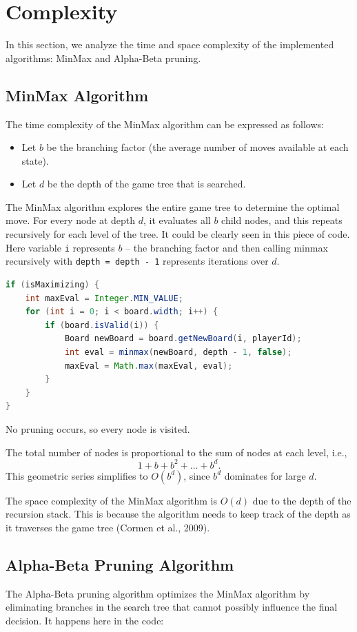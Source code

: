 \documentclass[11pt,a4paper]{article}
\begin{document}
\section{Complexity}
In this section, we analyze the time and space complexity of the implemented algorithms: MinMax and Alpha-Beta pruning.

\subsection{MinMax Algorithm}
The time complexity of the MinMax algorithm can be expressed as follows:
\begin{itemize}
    \item Let $b$ be the branching factor (the average number of moves available at each state).
    \item Let $d$ be the depth of the game tree that is searched.
\end{itemize}

The MinMax algorithm explores the entire game tree to determine the optimal move. For every node at depth $d$, it evaluates all $b$ child nodes, and this repeats recursively for each level of the tree. It could be clearly seen in this piece of code. Here variable \texttt{i} represents $b$ -- the branching factor and then calling minmax recursively with \texttt{depth = depth - 1} represents iterations over $d$.

\begin{lstlisting}[language=Java,basicstyle=\ttfamily\small,frame=single]
if (isMaximizing) {
    int maxEval = Integer.MIN_VALUE;
    for (int i = 0; i < board.width; i++) {
        if (board.isValid(i)) {
            Board newBoard = board.getNewBoard(i, playerId);
            int eval = minmax(newBoard, depth - 1, false);
            maxEval = Math.max(maxEval, eval);
        }
    }
}
\end{lstlisting}

No pruning occurs, so every node is visited.

The total number of nodes is proportional to the sum of nodes at each level, i.e.,
\[
1+b+b^2+\dots+b^d.
\]
This geometric series simplifies to $O(b^d)$, since $b^d$ dominates for large $d$.

The space complexity of the MinMax algorithm is $O(d)$ due to the depth of the recursion stack. This is because the algorithm needs to keep track of the depth as it traverses the game tree (Cormen et al., 2009).

\subsection{Alpha-Beta Pruning Algorithm}
The Alpha-Beta pruning algorithm optimizes the MinMax algorithm by eliminating branches in the search tree that cannot possibly influence the final decision. It happens here in the code:
\end{document}

